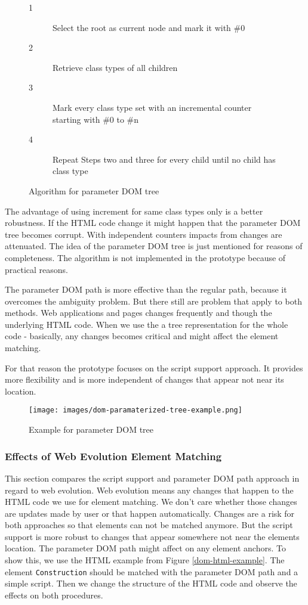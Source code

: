 \begin{figure}
\begin{description}
	\item[1] Select the root as current node and mark it with \#0
	\item[2] Retrieve class types of all children
	\item[3] Mark every class type set with an incremental counter starting with \#0 to \#n
	\item[4] Repeat Steps two and three for every child until no child has class type
\end{description}
\caption{Algorithm for parameter DOM tree}
\label{alg-param-dom-tree}
\end{figure}

The advantage of using increment for same class types only is a better robustness. If the HTML code change it might happen that the parameter DOM tree becomes corrupt. With independent counters impacts from changes are attenuated. 
The idea of the parameter DOM tree is just mentioned for reasons of completeness. The algorithm is not implemented in the prototype because of practical reasons. 

The parameter DOM path is more effective than the regular path, because it overcomes the ambiguity problem. But there still are problem that apply to both methods. Web applications and pages changes frequently and though the underlying HTML code. When we use the a tree representation for the whole code - basically, any changes becomes critical and might affect the element matching. 

For that reason the prototype focuses on the script support approach. It provides more flexibility and is more independent of changes that appear not near its location. 

\begin{figure}\centering
		\texttt{[image: images/dom-paramaterized-tree-example.png]}
		\caption{Example for parameter DOM tree}
		\label{dom-paramaterized-tree-example}
\end{figure} 

\subsubsection{Effects of Web Evolution Element Matching}

This section compares the script support and parameter DOM path approach in regard to web evolution. Web evolution means any changes that happen to the HTML code we use for element matching. We don't care whether those changes are updates made by user or that happen automatically. Changes are a risk for both approaches so that elements can not be matched anymore. But the script support is more robust to changes that appear somewhere not near the elements location. The parameter DOM path might affect on any element anchors.
To show this, we use the HTML example from Figure \ref{dom-html-example}. The element \verb^Construction^ should be matched with the parameter DOM path and a simple script. Then we change the structure of the HTML code and observe the effects on both procedures.

